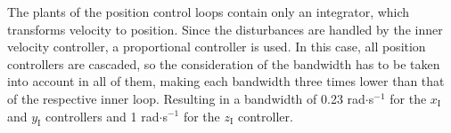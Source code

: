
The plants of the position control loops contain only an integrator, which transforms velocity to position. Since the disturbances are handled by the inner velocity controller, a proportional controller is used. In this case, all position controllers are cascaded, so the consideration of the bandwidth has to be taken into account in all of them, making each bandwidth three times lower than that of the respective inner loop. Resulting in a bandwidth of 0.23 rad$\cdot$s$^{-1}$ for the $x_{\mathrm{I}}$ and $y_{\mathrm{I}}$ controllers and 1 rad$\cdot$s$^{-1}$ for the $z_{\mathrm{I}}$ controller.

%
%
%
%
